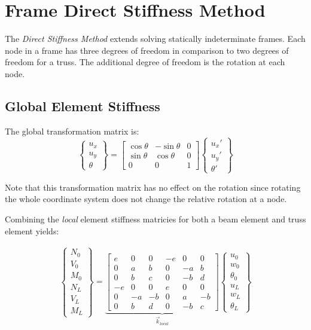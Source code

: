 \section{Frame Direct Stiffness Method}
The \textit{Direct Stiffness Method} extends solving statically indeterminate frames. Each node in a frame has three degrees of freedom in comparison to two degrees of freedom for a truss. The additional degree of freedom is the rotation at each node.

\subsection{Global Element Stiffness}

The global transformation matrix is:
\begin{equation}
	\begin{Bmatrix}
		u_x\\ u_y\\ \theta
	\end{Bmatrix}
	=
	\begin{bmatrix}
		\cos\theta & -\sin\theta & 0\\
		\sin\theta & \cos\theta & 0\\
		0 & 0 & 1
	\end{bmatrix}
	\begin{Bmatrix}
		u_x'\\ u_y'\\ \theta'
	\end{Bmatrix}
\end{equation}

Note that this transformation matrix has no effect on the rotation since rotating the whole coordinate system does not change the relative rotation at a node.

Combining the \textit{local} element stiffness matricies for both a beam element and truss element yields:

\begin{align}
	\begin{Bmatrix}
		N_0\\ V_0\\ M_0\\ \hline N_L\\ V_L\\ M_L
	\end{Bmatrix}
	=
  \underbrace{
	\left[
	\begin{array}{c|cc|c|cc}
		e & 0 & 0 & -e & 0 & 0\\ \hline
		0 & a & b & 0 & -a & b\\
		0 & b & c & 0 & -b & d\\ \hline
		-e & 0 & 0 & e & 0 & 0\\ \hline
		0 & -a & -b & 0 & a & -b\\
		0 & b & d & 0 & -b & c
	\end{array}
	\right]
  }_{\vec{k}_{local}}
	\begin{Bmatrix}
		u_0\\ w_0\\ \theta_0\\ \hline u_L\\ w_L\\ \theta_L
	\end{Bmatrix}
\end{align}


